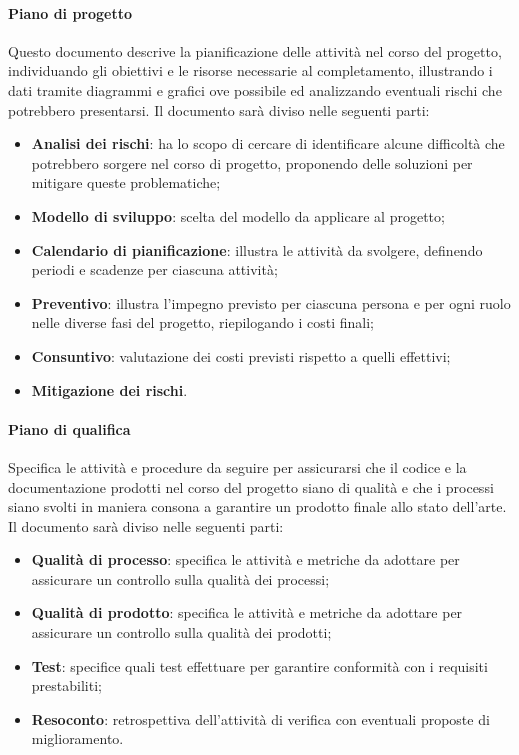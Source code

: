 \paragraph{Piano di progetto}      %
Questo documento descrive la pianificazione delle attività nel corso del progetto, individuando gli obiettivi e le risorse necessarie al completamento, illustrando i dati tramite diagrammi e grafici ove possibile ed analizzando eventuali rischi che potrebbero presentarsi.
Il documento sarà diviso nelle seguenti parti:
\begin{itemize}
    \item \textbf{Analisi dei rischi}: ha lo scopo di cercare di identificare alcune difficoltà che potrebbero sorgere nel corso di progetto, proponendo delle soluzioni per mitigare queste problematiche;
    \item \textbf{Modello di sviluppo}: scelta del modello da applicare al progetto;
    \item \textbf{Calendario di pianificazione}: illustra le attività da svolgere, definendo periodi e scadenze per ciascuna attività;
    \item \textbf{Preventivo}: illustra l'impegno previsto per ciascuna persona e per ogni ruolo nelle diverse fasi del progetto, riepilogando i costi finali;
    \item \textbf{Consuntivo}: valutazione dei costi previsti rispetto a quelli effettivi;
    \item \textbf{Mitigazione dei rischi}.
\end{itemize}

\paragraph{Piano di qualifica} %
Specifica le attività e procedure da seguire per assicurarsi che il codice e la documentazione prodotti nel corso del progetto siano di qualità e che i processi siano svolti in maniera consona a garantire un prodotto finale allo stato dell'arte.
Il documento sarà diviso nelle seguenti parti:
\begin{itemize}
    \item \textbf{Qualità di processo}: specifica le attività e metriche da adottare per assicurare un controllo sulla qualità dei processi;
    \item \textbf{Qualità di prodotto}: specifica le attività e metriche da adottare per assicurare un controllo sulla qualità dei prodotti;
    \item \textbf{Test}: specifice quali test effettuare per garantire conformità con i requisiti prestabiliti;
    \item \textbf{Resoconto}: retrospettiva dell'attività di verifica con eventuali proposte di miglioramento.
\end{itemize}

